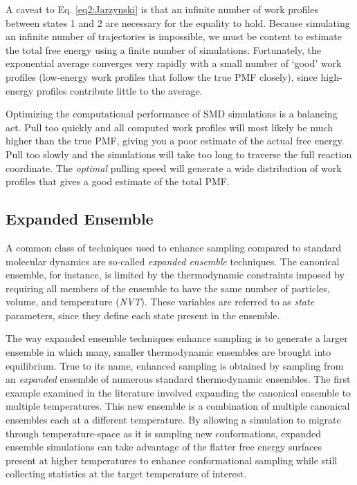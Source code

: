 A caveat to Eq. \ref{eq2:Jarzynski} is that an infinite number of work profiles
between states 1 and 2 are necessary for the equality to hold. Because
simulating an infinite number of trajectories is impossible, we must be content
to estimate the total free energy using a finite number of simulations.
Fortunately, the exponential average converges very rapidly with a small number
of `good' work profiles (\ie low-energy work profiles that follow the true PMF
closely), since high-energy profiles contribute little to the average.

Optimizing the computational performance of SMD simulations is a balancing
act. Pull too quickly and all computed work profiles will most likely be much
higher than the true PMF, giving you a poor estimate of the actual free energy.
Pull too slowly and the simulations will take too long to traverse the full
reaction coordinate. The \emph{optimal} pulling speed will generate a wide
distribution of work profiles that gives a good estimate of the total PMF.

\subsection{Expanded Ensemble}
\label{sec2:ExpandedEnsemble}

A common class of techniques used to enhance sampling compared to standard
molecular dynamics are so-called \emph{expanded ensemble} techniques. The
canonical ensemble, for instance,  is limited by the thermodynamic constraints
imposed by requiring all members of the ensemble to have the same number of
particles, volume, and temperature (\emph{NVT}). These variables are referred to
as \emph{state} parameters, since they define each state present in the
ensemble.

The way expanded ensemble techniques enhance sampling is to generate a larger
ensemble in which many, smaller thermodynamic ensembles are brought into
equilibrium. True to its name, enhanced sampling is obtained by sampling from an
\emph{expanded} ensemble of numerous standard thermodynamic ensembles. The first
example examined in the literature involved expanding the canonical ensemble to
multiple temperatures. \cite{Lyubartsev_JChemPhys_1992_v96_p1776} This new
ensemble is a combination of multiple canonical ensembles each at a different
temperature. By allowing a simulation to migrate through temperature-space as it
is sampling new conformations, expanded ensemble simulations can take advantage
of the flatter free energy surfaces present at higher temperatures to enhance
conformational sampling while still collecting statistics at the target
temperature of interest.

